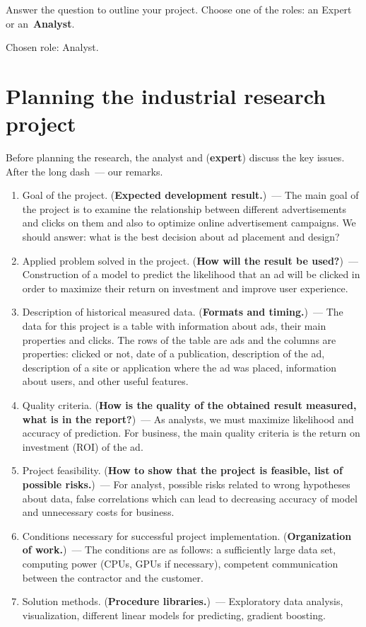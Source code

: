 \documentclass[12pt]{article}
\date{}
\begin{document}
\maketitle

Answer the question to outline your project. Choose one of the roles: an {Expert} or an~\textbf{Analyst}.

Chosen role: Analyst.

\section{Planning the industrial research project}
Before planning the research, the analyst and (\textbf{expert}) discuss the key issues. After the long dash~--- our remarks.

\begin{enumerate}
\item Goal of the project. (\textbf{Expected development result.})~---
The main goal of the project is to examine the relationship between different advertisements and clicks on them and also to optimize online advertisement campaigns. We should answer: what is the best decision about ad placement and design?
\item Applied problem solved in the project. (\textbf{How will the result be used?})~--- Construction of a model to predict the likelihood that an ad will be clicked in order to maximize their return on investment and improve user experience.
\item Description of historical measured data. (\textbf{Formats and timing.})~--- The data for this project is a table with information about ads, their main properties and clicks. The rows of the table are ads and the columns are properties: clicked or not, date of a publication, description of the ad, description of a site or application where the ad was placed, information about users, and other useful features.
\item Quality criteria. (\textbf{How is the quality of the obtained result measured, what is in the report?})~--- As analysts, we must maximize likelihood and accuracy of prediction. For business, the main quality criteria is the return on investment (ROI) of the ad.
\item Project feasibility. (\textbf{How to show that the project is feasible, list of possible risks.})~--- For analyst, possible risks related to wrong hypotheses about data, false correlations which can lead to decreasing accuracy of model and unnecessary costs for business.
\item Conditions necessary for successful project implementation. (\textbf{Organization of work.})~--- The conditions are as follows: a sufficiently large data set, computing power (CPUs, GPUs if necessary), competent communication between the contractor and the customer.
\item Solution methods. (\textbf{Procedure libraries.})~--- Exploratory data analysis, visualization, different linear models for predicting, gradient boosting.
\end{enumerate}
\end{document}
